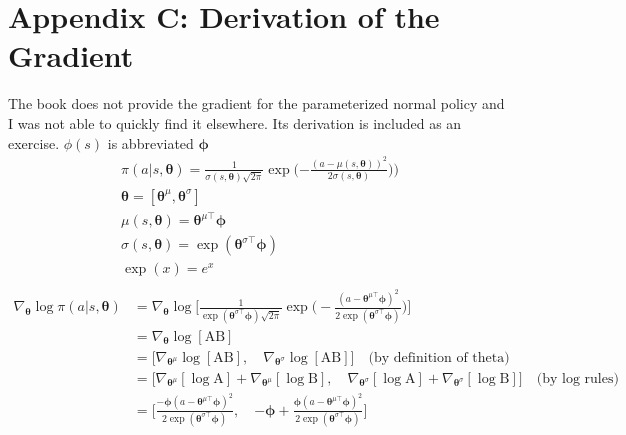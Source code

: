 \documentclass{article}
\newcommand{\grad}[1]{\nabla_{#1}}
\newcommand{\thetab}{\bm{\theta}}
\newcommand{\phib}{\bm{\phi}}
\begin{document}
\section{Appendix C: Derivation of the Gradient}

The book does not provide the gradient for the parameterized normal policy and I was not able to quickly find it elsewhere. Its derivation is included as an exercise. $\phi(s)$ is abbreviated $\phib$
\begin{gather*}
\pi (a | s, \thetab) =  \frac{1}{\sigma(s, \thetab)\sqrt{2\pi}}\exp\bigg({-\frac{(a - \mu(s, {\thetab}))^2}{2\sigma(s, \thetab)})}\bigg)\\
\thetab = [\thetab^\mu, \thetab^\sigma] \\
\mu(s, \thetab) = \thetab^{\mu\top}\phib\\
\sigma(s, \thetab) = \exp(\thetab^{\sigma\top}\phib)\\
\exp(x) = e^x\\
\end{gather*}
\begin{align*}
\grad{\thetab} \log\pi (a | s, \thetab) &= \grad{\thetab} \log \bigg[ \frac{1}{\exp(\thetab^
	{\sigma\top}\phib)\sqrt{2\pi}}\exp\bigg(- \frac{(a - \thetab^{\mu\top}\phib)^2}{2\exp(\thetab^{\sigma\top}\phib)}\bigg)\bigg]\\
&= \grad{\thetab}\log[\text{AB}] \\
&= \big[\grad{\thetab^\mu} \log[\text{AB}],\quad\grad{\thetab^\sigma}\log[\text{AB}]\big]  \quad\text{(by definition of theta)}\\
&= \big[\grad{\thetab^\mu}[\log\text{A}]+ \grad{\thetab^\mu}[\log\text{B}],\quad \grad{\thetab^\sigma}[\log\text{A}]+ \grad{\thetab^\sigma}[\log\text{B}]\big]  \quad\text{(by log rules)}\\
&= \bigg[\frac{{-\phib} (a - \thetab^{\mu\top}\phib)^2}{2\exp(\thetab^{\sigma\top}\phib)}  ,\quad {-\phib} + \frac{{\phib} (a - \thetab^{\mu\top}\phib)^2}{2\exp(\thetab^{\sigma\top}\phib)} \bigg] \\
 \\
\end{align*}
\end{document}
